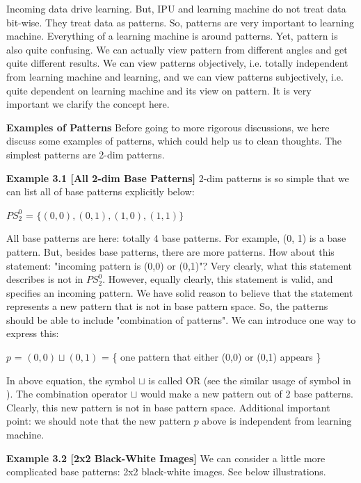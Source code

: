 Incoming data drive learning. But, IPU and learning machine do not treat data bit-wise. They treat data as patterns. So, patterns are very important to learning machine. Everything of a learning machine is around patterns. Yet, pattern is also quite confusing. We can actually view pattern from different angles and get quite different results. We can view patterns objectively, i.e. totally independent from learning machine and learning, and we can view patterns subjectively, i.e. quite dependent on learning machine and its view on pattern. It is very important we clarify the concept here.
\bigskip


{\bf Examples of Patterns}
Before going to more rigorous discussions, we here discuss some examples of patterns, which could help us to clean thoughts. The simplest patterns are 2-dim patterns. 

{\bf Example 3.1 [\bf All 2-dim Base Patterns]}
2-dim patterns is so simple that we can list all of base patterns explicitly below:
\begin{center}
$PS^0_2$ = $\{ (0,0), (0,1), (1,0), (1,1) \}$ 
\end{center} 


All base patterns are here: totally 4 base patterns. For example, (0, 1) is a base pattern. But, besides base patterns, there are more patterns. How about this statement: "incoming pattern is (0,0) or (0,1)"? Very clearly, what this statement describes is not in $PS^0_2$. However, equally clearly, this statement is valid, and specifies an incoming pattern. We have solid reason to believe that the statement represents a new pattern that is not in base pattern space. So, the patterns should be able to include "combination of patterns". We can introduce one way to express this:
\begin{center} 
$p$ = $(0,0) \sqcup (0, 1)$ = \{ one pattern that either (0,0) or (0,1) appears \} 
\end{center} 

In above equation, the symbol $\sqcup$ is called OR (see the similar usage of symbol in \cite{dlog}). The combination operator $\sqcup$ would make a new pattern out of 2 base patterns. Clearly, this new pattern is not in base pattern space. Additional important point: we should note that the new pattern $p$ above is independent from learning machine.  


{\bf Example 3.2 [\bf 2x2 Black-White Images]}
We can consider a little more complicated base patterns: 2x2 black-white images. See below illustrations.


